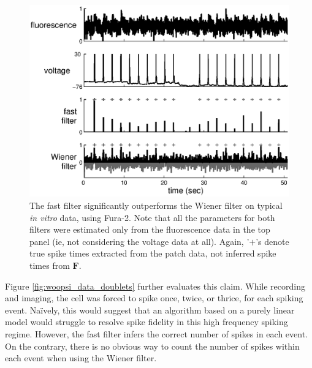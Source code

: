 \documentclass{article}
\providecommand{\ve}[1]{\boldsymbol{#1}}
\newcommand{\bF}{\ve{F}}
\newcommand{\foopsi}{fast }
\begin{document}
\begin{figure}[h!]
\centering \includegraphics[width=.9\linewidth]{woopsi_data_c4}
\caption[\foopsi filter outperforms Wiener filter on biological data]{The \foopsi filter significantly outperforms the Wiener filter on typical \emph{in vitro} data, using Fura-2. Note that all the parameters for both filters were estimated only from the fluorescence data in the top panel (ie, not considering the voltage data at all).  Again, '$+$'s denote true spike times extracted from the patch data, not inferred spike times from $\bF$.} \label{fig:woopsi_data}
\end{figure}

Figure \ref{fig:woopsi_data_doublets} further evaluates this claim.  While recording and imaging, the cell was forced to spike once, twice, or thrice, for each spiking event.  Na\"{i}vely, this would suggest that an algorithm based on a purely linear model would struggle to resolve spike fidelity in this high frequency spiking regime.  However, the \foopsi filter infers the correct number of spikes in each event.  On the contrary, there is no obvious way to count the number of spikes within each event when using the Wiener filter.
\end{document}
